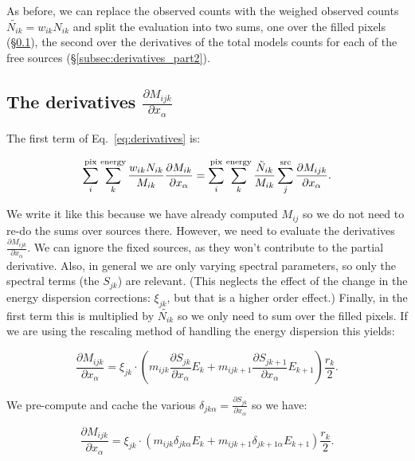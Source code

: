 \documentclass[preprint]{aastex}
\begin{document}
\noindent As before, we can replace the observed counts with the
weighed observed counts $\tilde{N_{ik}} = w_{ik} N_{ik}$ and split the
evaluation into two sums, one over the filled pixels
(\S\ref{subsec:derivatives_part1}), the second over the derivatives of
the total models counts for each of the free sources
(\S\ref{subsec:derivatives_part2}).


\subsection{The derivatives \texorpdfstring{$\frac{\partial M_{ijk}}{\partial x_{\alpha}}$}{dM/dx}}\label{subsec:derivatives_part1}

The first term of Eq.~\ref{eq:derivatives} is:

\begin{equation}
  \sum_i^{\rm pix} \sum_k^{\rm energy} \frac{w_{ik} N_{ik}}{M_{ik}} \frac{\partial M_{ik}}{\partial x_{\alpha}} = 
  \sum_i^{\rm pix} \sum_k^{\rm energy} \frac{\tilde{N}_{ik}}{M_{ik}} \sum_j^{\rm src} \frac{\partial M_{ijk}}{\partial x_{\alpha}}.
\end{equation}

We write it like this because we have already computed $M_{ij}$ so we
do not need to re-do the sums over sources there.  However, we need to
evaluate the derivatives $\frac{\partial M_{ijk}}{\partial x_{\alpha}}$.
We can ignore the fixed sources, as they won't contribute to the
partial derivative.  Also, in general we are only varying spectral
parameters, so only the spectral terms (the $S_{jk}$) are relevant.
(This neglects the effect of the change in the energy dispersion
corrections: $\xi_{jk}$, but that is a higher order effect.)  Finally,
in the first term this is multiplied by $\tilde{N_{ik}}$ so we only
need to sum over the filled pixels.  If we are using the rescaling
method of handling the energy dispersion this yields:

\begin{equation}
  \frac{\partial M_{ijk}}{\partial x_{\alpha}} = \xi_{jk} \cdot (m_{ijk} \frac{\partial S_{jk}}{\partial x_{\alpha}} E_k +  m_{ijk+1} \frac{\partial S_{jk+1}}{\partial x_{\alpha}} E_{k+1}) \frac{r_k}{2}.
\end{equation}

\noindent We pre-compute and cache the various $\delta_{jk\alpha} = \frac{\partial S_{jk}}{\partial x_{\alpha}}$ so we have:

\begin{equation}
  \frac{\partial M_{ijk}}{\partial x_{\alpha}} = \xi_{jk} \cdot (m_{ijk} \delta_{jk\alpha} E_k +  m_{ijk+1} \delta_{jk+1\alpha} E_{k+1}) \frac{r_k}{2}.
\end{equation}
\end{document}
